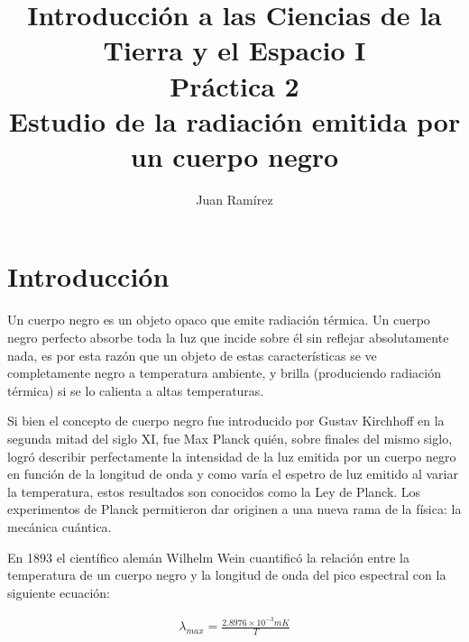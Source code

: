 \documentclass[a4paper]{article}
\title{\large Introducción a las Ciencias de la Tierra y el Espacio I\\[0.5cm]
Práctica 2\\[0.5cm]
\bf Estudio de la radiación emitida por un cuerpo negro}
\author{Juan Ramírez}
\begin{document}

\maketitle

\bigskip

\tableofcontents

\newpage
\section{Introducción}

Un cuerpo negro es un objeto opaco que emite radiación térmica. Un cuerpo negro perfecto absorbe toda la luz que incide sobre él sin reflejar absolutamente nada, es por esta razón que un objeto de estas características se ve completamente negro a temperatura ambiente, y brilla (produciendo radiación térmica) si se lo calienta a altas temperaturas.
\par
Si bien el concepto de cuerpo negro fue introducido por Gustav Kirchhoff en la segunda mitad del siglo XI, fue Max Planck quién, sobre finales del mismo siglo, logró describir perfectamente la intensidad de la luz emitida por un cuerpo negro en función de la longitud de onda y como varía el espetro de luz emitido al variar la temperatura, estos resultados son conocidos como la Ley de Planck. Los experimentos de Planck permitieron dar originen a una nueva rama de la física: la mecánica cuántica.
\par
En 1893 el científico alemán Wilhelm Wein cuantificó la relación entre la temperatura de un cuerpo negro y la longitud de onda del pico espectral con la siguiente ecuación:

\begin{align}
\lambda_{max} = \frac{2.8976 \times 10^{-3} mK}{T}
\label{eq:Wien}
\end{align}
\end{document}
